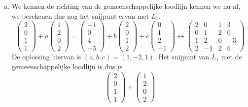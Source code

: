 \documentclass[main.tex]{subfiles}
\begin{document}
\begin{enumerate}
\begin{enumerate}[(a)]
\[    \right)
    \]
    Dit stelsel is strijdig, dus de doorsnede van $L_{1}$ en $L_{2}$ is leeg.
    $(1,2,0,2)$ is bovendien lineair onafhankelijk van $(2,0,1,2)$, dus de rechten kruisen.
  \item 
    We kennen de richting van de gemeenschappelijke loodlijn kennen we nu al, we berekenen dus nog het snijpunt ervan met $L_{1}$.
    \[ 
    \begin{pmatrix}
      2\\0\\1\\1
    \end{pmatrix}
    + a
    \begin{pmatrix}
      1\\2\\0\\2
    \end{pmatrix}
    =
    \begin{pmatrix}
      -1\\0\\4\\-5
    \end{pmatrix}
    + b
    \begin{pmatrix}
      2\\0\\1\\2
    \end{pmatrix}
    + c
    \begin{pmatrix}
      0\\1\\2\\-1
    \end{pmatrix}
    \longleftrightarrow
    \begin{pmatrix}
      2 & 0 & 1 & 3\\
      0 & 1 & 2 & 0\\
      1 & 2 & 0 & -3\\
      2 & -1 & 2 & 6
    \end{pmatrix}
    \]
    De oplossing hiervan is $(a,b,c)=(1,-2,1)$.
    Het snijpunt van $L_{1}$ met de gemeenschappelijke loodlijn is dus $p$:
    \[
    \begin{pmatrix}
      2\\0\\1\\1
    \end{pmatrix}
    +
    \begin{pmatrix}
      1\\2\\0\\2

\end{pmatrix}\]
\end{enumerate}
\end{enumerate}
\end{document}
